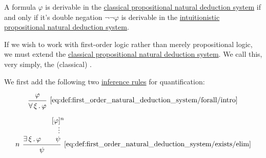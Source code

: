 \begin{theorem}\label{thm:glivenkos_double_negation_theorem}
  A formula \( \varphi \) is derivable in the \hyperref[def:classical_propositional_deductive_systems]{classical propositional natural deduction system} if and only if it's double negation \( \neg \neg \varphi \) is derivable in the \hyperref[def:intuitionistic_propositional_deductive_systems]{intuitionistic propositional natural deduction system}.
\end{theorem}

\begin{definition}\label{def:first_order_natural_deduction_system}
  If we wish to work with first-order logic rather than merely propositional logic, we must extend the \hyperref[def:classical_propositional_deductive_systems]{classical propositional natural deduction system}. We call this, very simply, the (classical) .

  \begin{thmenum}
     We first add the following two \hyperref[def:judgment/inference_rule]{inference rules} for quantification:

    \begin{minipage}{0.45\textwidth}
      \begin{equation*}\taglabel[\( \forall^+ \)]{eq:def:first_order_natural_deduction_system/forall/intro}
        \begin{prooftree}
          \hypo{ \varphi }
          \infer1[\ref{eq:def:first_order_natural_deduction_system/forall/intro}]{ \qforall \xi \varphi }
        \end{prooftree}
      \end{equation*}
    \end{minipage}
    \hfill
    \begin{minipage}{0.45\textwidth}
      \begin{equation*}\taglabel[\( \exists^- \)]{eq:def:first_order_natural_deduction_system/exists/elim}
        \begin{prooftree}
          \hypo{ \qexists \xi \varphi }
          \hypo{ [\varphi]^n }
          \ellipsis {} { \psi }
          \infer[left label=\( n \)]2[\ref{eq:def:first_order_natural_deduction_system/exists/elim}]{ \psi }
        \end{prooftree}
      \end{equation*}
    \end{minipage}


\end{thmenum}
\end{definition}
